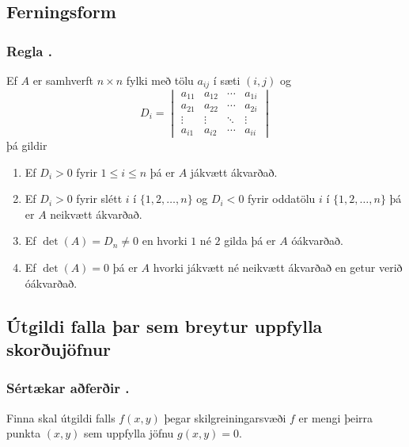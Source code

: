  
\subsection{Ferningsform}  

\subsubsection{Regla \kaflanr.}
Ef $A$ er samhverft $n \times n$ fylki með tölu $a_{ij}$ í sæti $(i,j)$ og
\begin {equation*}
 D_i = \begin{vmatrix}
        a_{11} & a_{12} & \cdots & a_{1i} \\
        a_{21} & a_{22} & \cdots & a_{2i} \\
        \vdots & \vdots & \ddots & \vdots \\ 
        a_{i1} & a_{i2} & \cdots & a_{ii} 
       \end{vmatrix}
\end {equation*}
þá gildir
\begin {enumerate}
 \item Ef $D_i > 0$ fyrir $1\leq i \leq n$ þá er $A$ jákvætt ákvarðað.
 \item Ef $D_i > 0$ fyrir slétt $i$ í $\{1,2,\ldots,n\}$ og $D_i < 0$ fyrir oddatölu $i$ í $\{1,2,\ldots,n\}$ þá er $A$ neikvætt ákvarðað.
 \item Ef $\det(A) = D_n \neq 0$ en hvorki $1$ né $2$ gilda þá er $A$ óákvarðað. 
 \item Ef $\det(A) = 0$ þá er $A$ hvorki jákvætt né neikvætt ákvarðað en getur verið óákvarðað.
\end {enumerate}




\subsection{Útgildi falla þar sem breytur uppfylla skorðujöfnur} 

\subsubsection{Sértækar aðferðir \kaflanr.}
Finna skal útgildi falls $f(x,y)$ þegar skilgreiningarsvæði $f$ er mengi þeirra punkta $(x,y)$ sem uppfylla jöfnu $g(x,y)=0$.  


